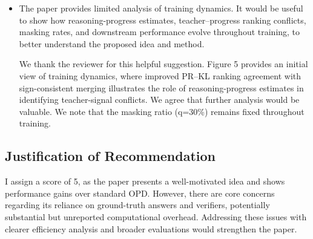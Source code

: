 \begin{itemize}
\item The paper provides limited analysis of training dynamics. It would be useful to show how reasoning-progress estimates, teacher--progress ranking conflicts, masking rates, and downstream performance evolve throughout training, to better understand the proposed idea and method.
\par{}
\begin{responsebox}[frametitle={Response to W3}]
We thank the reviewer for this helpful suggestion. Figure 5 provides an initial view of training dynamics, where improved PR--KL ranking agreement with sign-consistent merging illustrates the role of reasoning-progress estimates in identifying teacher-signal conflicts. We agree that further analysis would be valuable. We note that the masking ratio (q=30\%) remains fixed throughout training.
\end{responsebox}

\end{itemize}

\subsection*{Justification of Recommendation}
I assign a score of 5, as the paper presents a well-motivated idea and shows performance gains over standard OPD. However, there are core concerns regarding its reliance on ground-truth answers and verifiers, potentially substantial but unreported computational overhead. Addressing these issues with clearer efficiency analysis and broader evaluations would strengthen the paper.


\par{}
